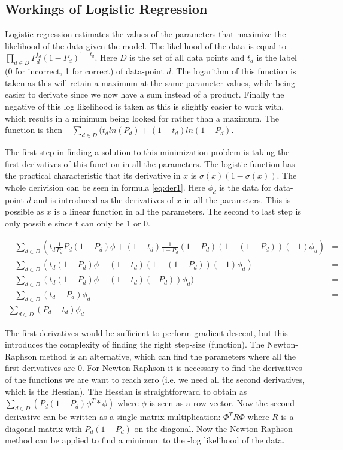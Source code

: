 \documentclass{scrartcl}
\begin{document}
\subsection{Workings of Logistic Regression}
Logistic regression estimates the values of the parameters that maximize the likelihood of the data given the model. The likelihood of the data is equal to $\prod_{d \in D} P_{d}^{t_d}  (1- P_{d})^{1-t_d} $. Here $D$ is the set of all data points and $t_{d}$ is the label (0 for incorrect, 1 for correct) of data-point $d$. The logarithm of this function is taken as this will retain a maximum at the same parameter values, while being easier to derivate since we now have a sum instead of a product. Finally the negative of this log likelihood is taken as this is slightly easier to work with, which results in a minimum being looked for rather than a maximum. The function is then $-\sum_{d \in D}(t_{d} ln(P_{d})+(1-t_{d}) ln(1-P_{d})$.

The first step in finding a solution to this minimization problem is taking the first derivatives of this function in all the parameters. The logistic function has the practical characteristic that its derivative in $x$ is $\sigma (x) (1- \sigma(x))$. The whole derivision can be seen in formula \ref{eq:der1}. Here $\phi_{d}$ is the data for data-point $d$ and is introduced as the derivatives of $x$ in all the parameters. This is possible as $x$ is a linear function in all the parameters. The second to last step is only possible since t can only be 1 or 0. 

\begin{equation}
\label{eq:der1}
\begin{split}
-\sum_{d \in D}(t_{d} \frac{1}{P_{d}} P_{d} (1-P_{d})\phi + (1-t_{d}) \frac{1}{1-P_{d}}(1-P_{d}) (1-(1-P_{d}))(-1)\phi_{d}) &=  \\
-\sum_{d \in D}(t_{d} (1-P_{d})\phi + (1-t_{d})(1-(1-P_{d}))(-1)\phi_{d}) &= \\
-\sum_{d \in D}(t_{d} (1-P_{d})\phi + (1-t_{d})(-P_{d}))\phi_{d}) & = \\
-\sum_{d \in D}(t_{d}-P_{d})\phi_{d} &= \\
\sum_{d \in D}(P_{d}-t_{d})\phi_{d} &
\end{split}
\end{equation}

The first derivatives would be sufficient to perform gradient descent, but this introduces the complexity of finding the right step-size (function). The Newton-Raphson method is an alternative, which can find the parameters where all the first derivatives are 0. For Newton Raphson it is necessary to find the derivatives of the functions we are want to reach zero (i.e. we need all the second derivatives, which is the Hessian). The Hessian is straightforward to obtain as $\sum_{d \in D}(P_{d} (1-P_{d}) \phi^{T}*\phi)$ where $\phi$ is seen as a row vector. Now the second derivative can be written as a single matrix multiplication: $\Phi^{T} R \Phi$ where $R$ is a diagonal matrix with $P_{d} (1-P_{d})$ on the diagonal. Now the Newton-Raphson method can be applied to find a minimum to the -log likelihood of the data.
\end{document}
